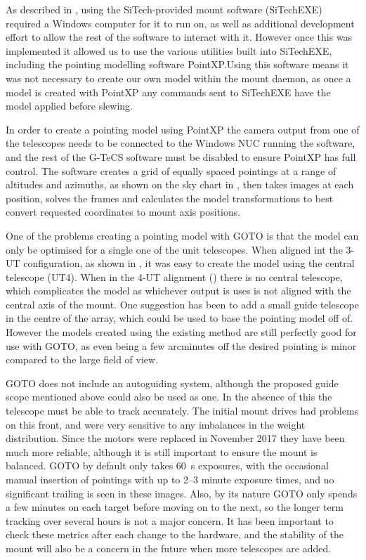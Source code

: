 \begin{colsection}
\begin{colsection}
As described in , using the SiTech-provided mount software (SiTechEXE) required a Windows computer for it to run on, as well as additional development effort to allow the rest of the software to interact with it. However once this was implemented it allowed us to use the various utilities built into SiTechEXE, including the pointing modelling software PointXP.\@ Using this software means it was not necessary to create our own model within the mount daemon, as once a model is created with PointXP any commands sent to SiTechEXE have the model applied before slewing.

In order to create a pointing model using PointXP the camera output from one of the telescopes needs to be connected to the Windows NUC running the software, and the rest of the G-TeCS software must be disabled to ensure PointXP has full control. The software creates a grid of equally spaced pointings at a range of altitudes and azimuths, as shown on the sky chart in , then takes images at each position, solves the frames and calculates the model transformations to best convert requested coordinates to mount axis positions.

\newpage

One of the problems creating a pointing model with GOTO is that the model can only be optimised for a single one of the unit telescopes. When aligned int the 3-UT configuration, as shown in , it was easy to create the model using the central telescope (UT4). When in the 4-UT alignment () there is no central telescope, which complicates the model as whichever output is uses is not aligned with the central axis of the mount. One suggestion has been to add a small guide telescope in the centre of the array, which could be used to base the pointing model off of. However the models created using the existing method are still perfectly good for use with GOTO, as even being a few arcminutes off the desired pointing is minor compared to the large field of view.

GOTO does not include an autoguiding system, although the proposed guide scope mentioned above could also be used as one. In the absence of this the telescope must be able to track accurately. The initial mount drives had problems on this front, and were very sensitive to any imbalances in the weight distribution. Since the motors were replaced in November 2017 they have been much more reliable, although it is still important to ensure the mount is balanced. GOTO by default only takes \SI{60}{\second} exposures, with the occasional manual insertion of pointings with up to 2--3 minute exposure times, and no significant trailing is seen in these images. Also, by its nature GOTO only spends a few minutes on each target before moving on to the next, so the longer term tracking over several hours is not a major concern. It has been important to check these metrics after each change to the hardware, and the stability of the mount will also be a concern in the future when more telescopes are added.


\end{colsection}
\end{colsection}
